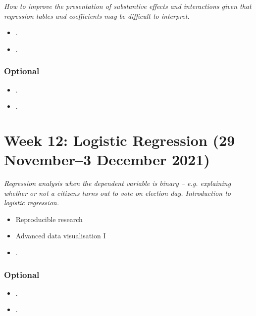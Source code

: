 \documentclass[abstract=on,parskip=full,headings=standardclasses,fontsize=11pt,paper=a4]{scrartcl}
\begin{document}
\textit{How to improve the presentation of substantive effects and interactions given that regression tables and coefficients may be difficult to interpret.}

\begin{itemize}
\item {}.
\item {}.
\end{itemize}

\subsubsection*{Optional}
\begin{itemize}
\item {}.
\item {}.
\end{itemize}
 
\section{Week 12: Logistic Regression  (29 November--3 December 2021)}


\textit{Regression analysis when the dependent variable is binary -- e.g. explaining whether or not a citizens turns out to vote on election day. Introduction to logistic regression.}


\begin{itemize}
\item Reproducible research
\item Advanced data visualisation I
\end{itemize}


\begin{itemize}
\item {}.
\end{itemize}



\subsubsection*{Optional}
\begin{itemize}
\item {}.
\item {}.
\end{itemize}
\end{document}
